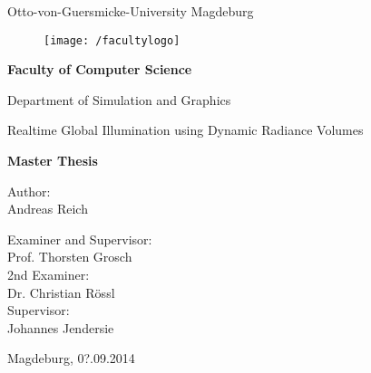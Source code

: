 \documentclass[thesis.tex]{subfiles}
\begin{document}
\thispagestyle {empty}

\begin{center}
\begin{Large}
Otto-von-Guersmicke-University Magdeburg\\

\begin{figure}
	\centering
	\texttt{[image: /facultylogo]}
	\label{fig:logoinffak}
\end{figure}

\vspace{3mm}

\textbf{Faculty of Computer Science}\\
\end{Large}

\vspace{3mm}

Department of Simulation and Graphics\\

\vspace{1cm}
\begin{LARGE}
Realtime Global Illumination using Dynamic Radiance Volumes\\
\end{LARGE}
\vspace{15mm}
{\Huge \textbf{Master Thesis}}\\
\vspace{15mm}

Author:\\
\vspace{4mm}
{\Large Andreas Reich}\\

\vspace{14mm}

Examiner and Supervisor:\\
\vspace{2mm}
{\Large Prof. Thorsten Grosch}\\
\vspace{4mm}
2nd Examiner:\\
\vspace{2mm}
{\Large Dr. Christian Rössl}\\
\vspace{8mm}
Supervisor:\\
\vspace{2mm}
{\Large Johannes Jendersie}\\


\vspace{20mm}

{\large Magdeburg, 0?.09.2014}\\

\vspace{40mm}

\end{center}
\clearpage
\end{document}
